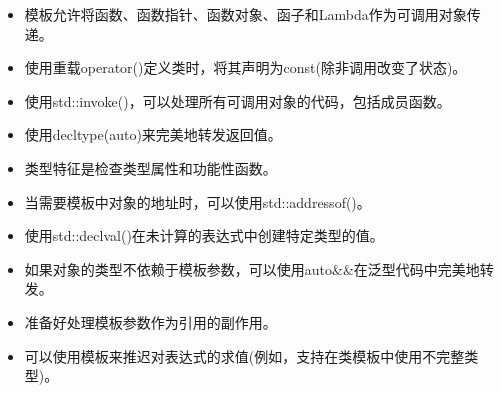 
\begin{itemize}
\item 
模板允许将函数、函数指针、函数对象、函子和Lambda作为可调用对象传递。

\item 
使用重载operator()定义类时，将其声明为const(除非调用改变了状态)。

\item 
使用std::invoke()，可以处理所有可调用对象的代码，包括成员函数。

\item 
使用decltype(auto)来完美地转发返回值。

\item 
类型特征是检查类型属性和功能性函数。

\item 
当需要模板中对象的地址时，可以使用std::addressof()。

\item 
使用std::declval()在未计算的表达式中创建特定类型的值。

\item 
如果对象的类型不依赖于模板参数，可以使用auto\&\&在泛型代码中完美地转发。

\item 
准备好处理模板参数作为引用的副作用。

\item 
可以使用模板来推迟对表达式的求值(例如，支持在类模板中使用不完整类型)。
\end{itemize}